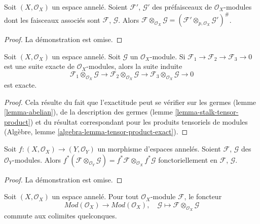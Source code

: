 \begin{lemma}
\label{lemma-tensor-product-sheafification}
Soit $(X, \mathcal{O}_X)$ un espace annelé.
Soient $\mathcal{F}'$, $\mathcal{G}'$ des préfaisceaux de $\mathcal{O}_X$-modules
dont les faisceaux associés sont $\mathcal{F}$, $\mathcal{G}$. Alors
$\mathcal{F} \otimes_{\mathcal{O}_X} \mathcal{G} =
(\mathcal{F}' \otimes_{p, \mathcal{O}_X} \mathcal{G}')^\#$.
\end{lemma}

\begin{proof}
La démonstration est omise.
\end{proof}


\begin{lemma}
\label{lemma-tensor-product-exact}
Soit $(X, \mathcal{O}_X)$ un espace annelé.
Soit $\mathcal{G}$ un $\mathcal{O}_X$-module.
Si
$\mathcal{F}_1
\to \mathcal{F}_2
\to \mathcal{F}_3
\to 0$
est une suite exacte de $\mathcal{O}_X$-modules, alors
la suite induite
$$
\mathcal{F}_1 \otimes_{\mathcal{O}_X} \mathcal{G} \to
\mathcal{F}_2 \otimes_{\mathcal{O}_X} \mathcal{G} \to
\mathcal{F}_3 \otimes_{\mathcal{O}_X} \mathcal{G} \to
0
$$
est exacte.
\end{lemma}

\begin{proof}
Cela résulte du fait que l'exactitude peut se vérifier sur les germes
(lemme \ref{lemma-abelian}), de la description des germes
(lemme \ref{lemma-stalk-tensor-product}) et du résultat correspondant
pour les produits tensoriels de modules
(Algèbre, lemme \ref{algebra-lemma-tensor-product-exact}).
\end{proof}

\begin{lemma}
\label{lemma-tensor-product-pullback}
Soit $f : (X, \mathcal{O}_X) \to (Y, \mathcal{O}_Y)$
un morphisme d'espaces annelés. Soient $\mathcal{F}$, $\mathcal{G}$
des $\mathcal{O}_Y$-modules. Alors
$f^*(\mathcal{F} \otimes_{\mathcal{O}_Y} \mathcal{G})
= f^*\mathcal{F} \otimes_{\mathcal{O}_X} f^*\mathcal{G}$
fonctoriellement en $\mathcal{F}$, $\mathcal{G}$.
\end{lemma}

\begin{proof}
La démonstration est omise.
\end{proof}

\begin{lemma}
\label{lemma-tensor-commute-colimits}
Soit $(X, \mathcal{O}_X)$ un espace annelé.
Pour tout $\mathcal{O}_X$-module $\mathcal{F}$, le foncteur
$$
\textit{Mod}(\mathcal{O}_X) \longrightarrow \textit{Mod}(\mathcal{O}_X)
, \quad
\mathcal{G} \longmapsto \mathcal{F} \otimes_{\mathcal{O}_X} \mathcal{G}
$$
commute aux colimites quelconques.
\end{lemma}

